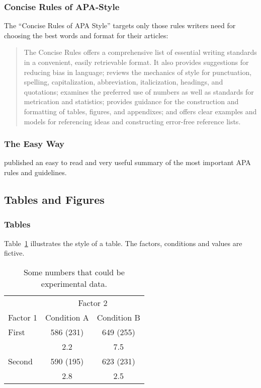 \documentclass[jou,a4paper,notxfonts]{apa}
\begin{document}
\subsubsection{Concise Rules of APA-Style}
The ``Concise Rules of APA Style'' \cite{apamanual2}
targets only those rules writers need for choosing the best
words and format for their articles:
\begin{quotation}

The Concise Rules offers a comprehensive list of essential
writing standards in a convenient, easily retrievable
format. It also provides suggestions for reducing
bias in language; reviews the mechanics of
style for punctuation, spelling, capitalization, abbreviation,
italicization, headings, and quotations; examines
the preferred use of numbers as well as standards
for metrication and statistics; provides guidance for
the construction and formatting of tables, figures, and
appendixes; and offers clear examples and models for
referencing ideas and constructing error-free reference
lists.

\end{quotation}

\subsubsection{The Easy Way}
 published
an easy to read and very useful summary of the most
important APA rules and guidelines.

\subsection{Tables and Figures}
\subsubsection{Tables}
Table~\ref{tab:tab1} illustrates the style of a table. The
factors, conditions and values are fictive.

\begin{table}[h]
 \caption{Some numbers that could be experimental data.}
 \label{tab:tab1}
 \begin{tabular}{lcc}\hline
           & \multicolumn{2}{c}{Factor 2} \\ \cline{2-3}
 Factor 1  & Condition A  & Condition B   \\ \hline
 First     & 586 (231)    & 649 (255)     \\
           &    2.2       &    7.5        \\
 Second    & 590 (195)    & 623 (231)     \\
           &    2.8       &    2.5        \\ \hline
 \end{tabular}
\end{table}
\end{document}

